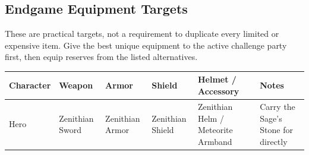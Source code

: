 \documentclass[
  american,
  10pt,
  letterpaper,
  oneside,
  open=any]{scrreprt}
\newcounter{none} %
\newenvironment{guidetable}{%
  \small\setstretch{1.0}%
  \setlength{\tabcolsep}{4pt}%
  \setlength{\LTpre}{8pt}\setlength{\LTpost}{10pt}%
  \renewcommand{\arraystretch}{1.16}%
}{ }
\begin{document}
\begin{landscape}

\section{Endgame Equipment Targets}\label{endgame-equipment-targets}

These are practical targets, not a requirement to duplicate every
limited or expensive item. Give the best unique equipment to the active
challenge party first, then equip reserves from the listed alternatives.

\begin{guidetable}

{\def\LTcaptype{none} %
\begin{longtable}[]{@{}
  >{\raggedright\arraybackslash}p{}
  >{\raggedright\arraybackslash}p{}
  >{\raggedright\arraybackslash}p{}
  >{\raggedright\arraybackslash}p{}
  >{\raggedright\arraybackslash}p{}
  >{\raggedright\arraybackslash}p{}@{}}
\toprule\noalign{}
\begin{minipage}[b]{\linewidth}\raggedright
\color{GuideGreen}\bfseries Character
\end{minipage} & \begin{minipage}[b]{\linewidth}\raggedright
\color{GuideGreen}\bfseries Weapon
\end{minipage} & \begin{minipage}[b]{\linewidth}\raggedright
\color{GuideGreen}\bfseries Armor
\end{minipage} & \begin{minipage}[b]{\linewidth}\raggedright
\color{GuideGreen}\bfseries Shield
\end{minipage} & \begin{minipage}[b]{\linewidth}\raggedright
\color{GuideGreen}\bfseries Helmet / Accessory
\end{minipage} & \begin{minipage}[b]{\linewidth}\raggedright
\color{GuideGreen}\bfseries Notes
\end{minipage} \\
\midrule\noalign{}
\endhead
\bottomrule\noalign{}
\endlastfoot
Hero & Zenithian Sword & Zenithian Armor & Zenithian Shield & Zenithian
Helm / Meteorite Armband & Carry the Sage's Stone for directly

\end{longtable}}
\end{guidetable}
\end{landscape}
\end{document}
